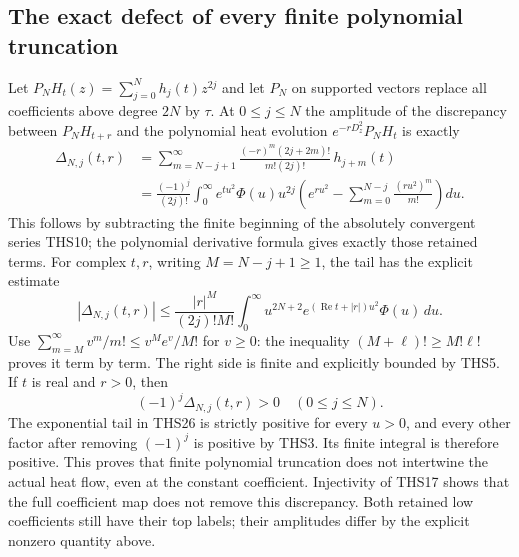 \subsection{The exact defect of every finite polynomial truncation}

Let $P_NH_t(z)=\sum_{j=0}^Nh_j(t)z^{2j}$ and let $P_N$ on
supported vectors replace all coefficients above degree $2N$
by $\tau$. At $0\le j\le N$ the amplitude of the discrepancy
between $P_NH_{t+r}$ and the polynomial heat evolution
$e^{-rD_z^2}P_NH_t$ is exactly
\begin{equation}\tag{THS26}
\begin{split}
 \Delta_{N,j}(t,r)
 &=\sum_{m=N-j+1}^{\infty}
       \frac{(-r)^m(2j+2m)!}{m!(2j)!}\,h_{j+m}(t)\\
 &=\frac{(-1)^j}{(2j)!}\int_0^\infty e^{tu^2}\Phi(u)u^{2j}
   \left(e^{ru^2}-\sum_{m=0}^{N-j}\frac{(ru^2)^m}{m!}\right)du.
\end{split}
\end{equation}
This follows by subtracting the finite beginning of the absolutely
convergent series THS10; the polynomial derivative formula gives
exactly those retained terms. For complex $t,r$, writing
$M=N-j+1\ge1$, the tail has the explicit estimate
\begin{equation}\tag{THS27}
 |\Delta_{N,j}(t,r)|
 \le\frac{|r|^M}{(2j)!M!}
      \int_0^\infty u^{2N+2}
          e^{(\operatorname{Re}t+|r|)u^2}\Phi(u)\,du.
\end{equation}
Use $\sum_{m=M}^{\infty}v^m/m!\le v^Me^v/M!$ for $v\ge0$:
the inequality $(M+\ell)!\ge M!\ell!$ proves it term by term.
The right side is finite and explicitly bounded by THS5.
If $t$ is real and $r>0$, then
\begin{equation}\tag{THS28}
             (-1)^j\Delta_{N,j}(t,r)>0
             \quad(0\le j\le N).
\end{equation}
The exponential tail in THS26 is strictly positive for every
$u>0$, and every other factor after removing $(-1)^j$ is
positive by THS3. Its finite integral is therefore positive.
This proves that finite polynomial truncation does not
intertwine the actual heat flow, even at the constant coefficient.
Injectivity of THS17 shows that the full coefficient map does
not remove this discrepancy. Both retained low coefficients
still have their top labels; their amplitudes differ by the
explicit nonzero quantity above.

